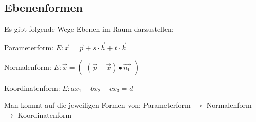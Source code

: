 \subsection{Ebenenformen}
\label{sec:ebenen_formen}
Es gibt folgende Wege Ebenen im Raum darzustellen: 

Parameterform: $E: \vec{x} = \vec{p} + s\cdot\vec{h} + t\cdot\vec{k}$

Normalenform: $
E: \vec{x} =
\begin{pmatrix}
    (\vec{p} - \vec{x}) \bullet \vec{n_0}
\end{pmatrix}
$ 

Koordinatenform: $E: ax_1 + bx_2 + cx_3 = d$

Man kommt auf die jeweiligen Formen von: Parameterform $\rightarrow$ Normalenform $\rightarrow$ Koordinatenform





